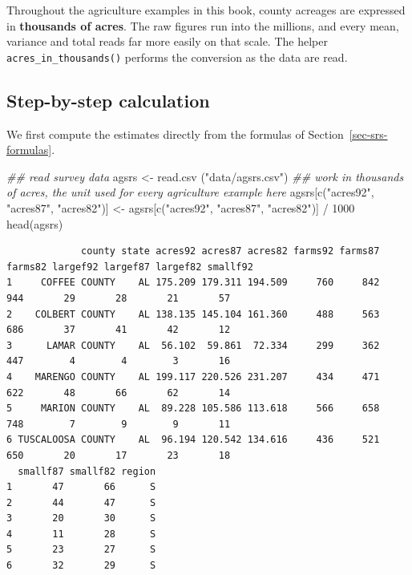 \documentclass[
  letterpaper,
  DIV=11,
  numbers=noendperiod]{scrreprt}
\newenvironment{Shaded}{\begin{snugshade}}{\end{snugshade}}
\newcommand{\DecValTok}[1]{\textcolor[rgb]{0.68,0.00,0.00}{#1}}
\newcommand{\DocumentationTok}[1]{\textcolor[rgb]{0.37,0.37,0.37}{\textit{#1}}}
\newcommand{\FunctionTok}[1]{\textcolor[rgb]{0.28,0.35,0.67}{#1}}
\newcommand{\NormalTok}[1]{\textcolor[rgb]{0.00,0.23,0.31}{#1}}
\newcommand{\OtherTok}[1]{\textcolor[rgb]{0.00,0.23,0.31}{#1}}
\newcommand{\SpecialCharTok}[1]{\textcolor[rgb]{0.37,0.37,0.37}{#1}}
\newcommand{\StringTok}[1]{\textcolor[rgb]{0.13,0.47,0.30}{#1}}
\renewcommand{\[}{\begin{equation}}
\renewcommand{\]}{\end{equation}}
\begin{document}
Throughout the agriculture examples in this book, county acreages are
expressed in \textbf{thousands of acres}. The raw figures run into the
millions, and every mean, variance and total reads far more easily on
that scale. The helper \texttt{acres\_in\_thousands()} performs the
conversion as the data are read.

\subsection{Step-by-step calculation}\label{step-by-step-calculation}

We first compute the estimates directly from the formulas of
Section~\ref{sec-srs-formulas}.

\begin{Shaded}
\begin{Highlighting}[]
\DocumentationTok{\#\# read survey data}
\NormalTok{agsrs }\OtherTok{\textless{}{-}} \FunctionTok{read.csv}\NormalTok{ (}\StringTok{"data/agsrs.csv"}\NormalTok{)}
\DocumentationTok{\#\# work in thousands of acres, the unit used for every agriculture example here}
\NormalTok{agsrs[}\FunctionTok{c}\NormalTok{(}\StringTok{"acres92"}\NormalTok{, }\StringTok{"acres87"}\NormalTok{, }\StringTok{"acres82"}\NormalTok{)] }\OtherTok{\textless{}{-}}\NormalTok{ agsrs[}\FunctionTok{c}\NormalTok{(}\StringTok{"acres92"}\NormalTok{, }\StringTok{"acres87"}\NormalTok{, }\StringTok{"acres82"}\NormalTok{)] }\SpecialCharTok{/} \DecValTok{1000}
\FunctionTok{head}\NormalTok{(agsrs)}
\end{Highlighting}
\end{Shaded}

\begin{verbatim}
             county state acres92 acres87 acres82 farms92 farms87 farms82 largef92 largef87 largef82 smallf92
1     COFFEE COUNTY    AL 175.209 179.311 194.509     760     842     944       29       28       21       57
2    COLBERT COUNTY    AL 138.135 145.104 161.360     488     563     686       37       41       42       12
3      LAMAR COUNTY    AL  56.102  59.861  72.334     299     362     447        4        4        3       16
4    MARENGO COUNTY    AL 199.117 220.526 231.207     434     471     622       48       66       62       14
5     MARION COUNTY    AL  89.228 105.586 113.618     566     658     748        7        9        9       11
6 TUSCALOOSA COUNTY    AL  96.194 120.542 134.616     436     521     650       20       17       23       18
  smallf87 smallf82 region
1       47       66      S
2       44       47      S
3       20       30      S
4       11       28      S
5       23       27      S
6       32       29      S
\end{verbatim}
\end{document}
